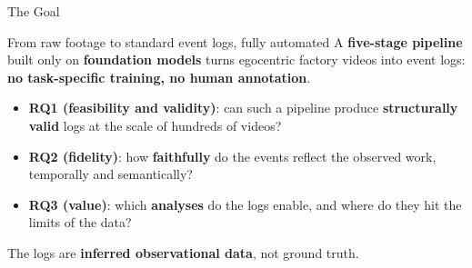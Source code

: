 \documentclass[aspectratio=169]{beamer}
\newcommand{\keyc}[1]{\textbf{\textcolor{egoblue}{#1}}}
\newcommand{\keyg}[1]{\textbf{\textcolor{egogreen!70!black}{#1}}}
\newcommand{\keya}[1]{\textbf{\textcolor{egoamber!85!black}{#1}}}
\begin{document}
\begin{frame}{The Goal}
  \begin{block}{From raw footage to standard event logs, fully automated}
    A \keyc{five-stage pipeline} built only on \keyc{foundation models}
    turns egocentric factory videos into event logs:
    \keya{no task-specific training, no human annotation}.
  \end{block}
  \vspace{4mm}
  \begin{itemize}\setlength{\itemsep}{7pt}
    \item \keyc{RQ1 (feasibility and validity)}: can such a pipeline produce
      \keyg{structurally valid} logs at the scale of hundreds of videos?
    \item \keyc{RQ2 (fidelity)}: how \keyg{faithfully} do the events reflect
      the observed work, temporally and semantically?
    \item \keyc{RQ3 (value)}: which \keyg{analyses} do the logs enable,
      and where do they hit the limits of the data?
  \end{itemize}
  \vspace{3mm}
  \small The logs are \keya{inferred observational data}, not ground truth.
\end{frame}
\end{document}
